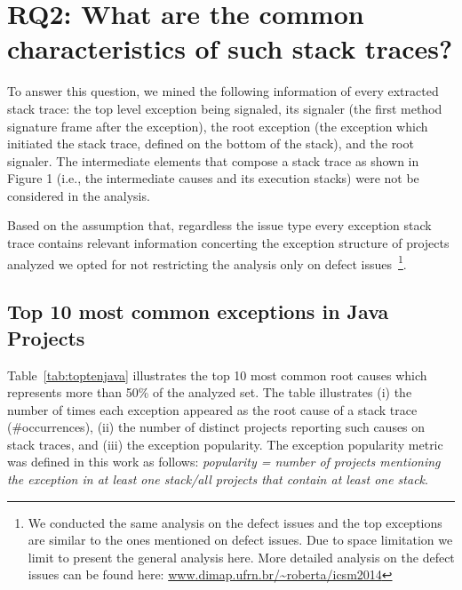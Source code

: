 \documentclass[conference]{IEEEtran}
\begin{document}


\section{RQ2: What are the common characteristics of such stack traces?}

To answer this question, we mined the following information of every extracted stack trace: the top level exception being signaled, its signaler (the first method signature frame after the exception), the root exception (the exception which initiated the stack trace, defined on the bottom of the stack), and the root signaler. The intermediate elements that compose a stack trace as shown in Figure 1 (i.e., the intermediate causes and its execution stacks) were not be considered in the analysis.~

Based on the assumption that, regardless the issue type every exception stack trace contains relevant information concerting the exception structure of projects analyzed we opted for not restricting the analysis only on defect issues~\footnote{We conducted the same analysis on the defect issues and the top exceptions are similar to the ones mentioned on defect issues. Due to space limitation we limit to present the general analysis here. More detailed analysis on the defect issues can be found here: \url{www.dimap.ufrn.br/~roberta/icsm2014}}. 

\subsection{Top 10 most common exceptions in Java Projects}

Table~\ref{tab:toptenjava} illustrates the top 10 most common root causes which represents more than 50\% of the analyzed set. The table illustrates  (i) the number of times each exception appeared as the root cause of a stack trace (\#occurrences), (ii) the number of distinct projects reporting such causes on stack traces, and (iii) the exception popularity. The exception popularity metric was defined in this work as follows: \emph{popularity = number of projects mentioning the exception in at least one stack/all projects that contain at least one stack}.
\end{document}

